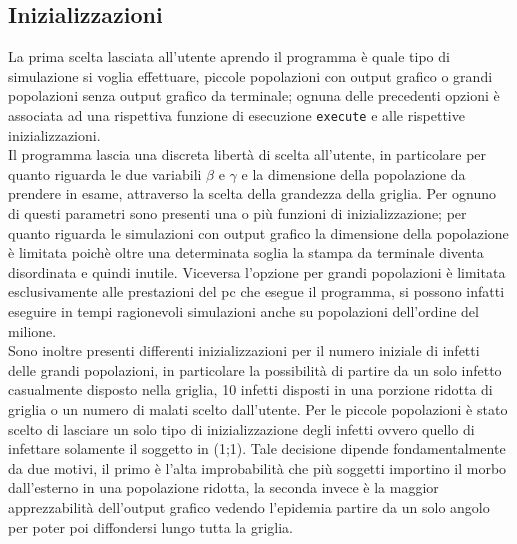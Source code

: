 \documentclass[a4paper]{article}
\begin{document}
\subsection{Inizializzazioni}
La prima scelta lasciata all'utente aprendo il programma è quale tipo di simulazione si voglia effettuare, piccole popolazioni con output grafico o grandi popolazioni senza output grafico da terminale; ognuna delle precedenti opzioni è associata ad una rispettiva funzione di esecuzione \texttt{execute} e alle rispettive inizializzazioni.\\
Il programma lascia una discreta libertà di scelta all'utente, in particolare per quanto riguarda le due variabili  $\beta$ e $\gamma$ e la dimensione della popolazione da prendere in esame, attraverso la scelta della grandezza della griglia. Per ognuno di questi parametri sono presenti una o più funzioni di inizializzazione; per quanto riguarda le simulazioni con output grafico la dimensione della popolazione è limitata poichè oltre una determinata soglia la stampa da terminale diventa disordinata e quindi inutile. Viceversa l'opzione per grandi popolazioni è limitata esclusivamente alle prestazioni del pc che esegue il programma, si possono infatti eseguire in tempi ragionevoli simulazioni anche su popolazioni dell'ordine del milione.\\
Sono inoltre presenti differenti inizializzazioni per il numero iniziale di infetti delle grandi popolazioni, in particolare la possibilità di partire da un solo infetto casualmente disposto nella griglia, 10 infetti disposti in una porzione ridotta di griglia o un numero di malati scelto dall'utente. Per le piccole popolazioni è stato scelto di lasciare un solo tipo di inizializzazione degli infetti ovvero quello di infettare solamente il soggetto in (1;1). Tale decisione dipende fondamentalmente da due motivi, il primo è l'alta improbabilità che più soggetti importino il morbo dall'esterno in una popolazione ridotta, la seconda invece è la maggior apprezzabilità dell'output grafico vedendo l'epidemia partire da un solo angolo per poter poi diffondersi lungo tutta la griglia. \\
\end{document}
